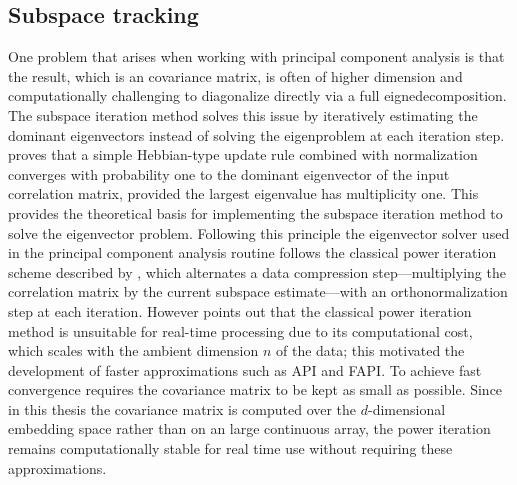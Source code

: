 \subsection{Subspace tracking}
One problem that arises when working with principal component analysis is that the result, which is an covariance matrix, is often of higher dimension and computationally challenging to diagonalize directly via a full eignedecomposition. The subspace iteration method solves this issue by iteratively estimating the dominant eigenvectors instead of solving the eigenproblem at each iteration step. \textcite[p.~270]{Oja1982SimplifiedNM} proves that a simple Hebbian-type update rule combined with normalization converges with probability one to the dominant eigenvector of the input correlation matrix, provided the largest eigenvalue has multiplicity one. This provides the theoretical basis for implementing the subspace iteration method to solve the eigenvector problem.
Following this principle the eigenvector solver used in the principal component analysis routine follows the classical power iteration scheme described by \textcite[p.~2932]{1468483}, which alternates a data compression step—multiplying the correlation matrix by the current subspace estimate—with an orthonormalization step at each iteration.
However \textcite[p.~2932]{1468483} points out that the classical power iteration method is unsuitable for real-time processing due to its computational cost, which scales with the ambient dimension $n$ of the data; this motivated the development of faster approximations such as API and FAPI. 
To achieve fast convergence requires the covariance matrix to be kept as small as possible. Since in this thesis the covariance matrix is computed over the $d$-dimensional embedding space rather than on an large continuous array, the power iteration remains computationally stable for real time use without requiring these approximations.

